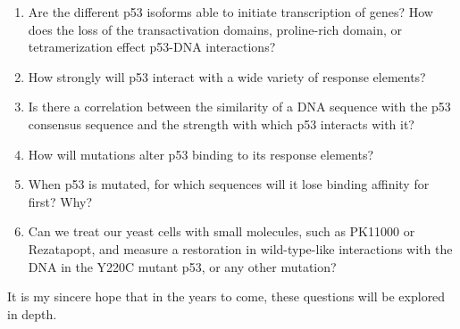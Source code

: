 \begin{enumerate}
\item Are the different p53 isoforms able to initiate transcription of genes? How does the loss of the transactivation domains, proline-rich domain, or tetramerization effect p53-DNA interactions?
\item How strongly will p53 interact with a wide variety of response elements?
\item Is there a correlation between the similarity of a DNA sequence with the p53 consensus sequence and the strength with which p53 interacts with it?
\item How will mutations alter p53 binding to its response elements?
\item When p53 is mutated, for which sequences will it lose binding affinity for first? Why?
\item Can we treat our yeast cells with small molecules, such as PK11000 or Rezatapopt, and measure a restoration in wild-type-like interactions with the DNA in the Y220C mutant p53, or any other mutation?
\end{enumerate}

It is my sincere hope that in the years to come, these questions will be explored in depth.